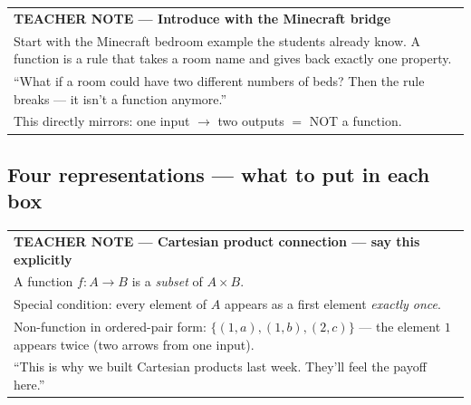 \documentclass[11pt]{article}
\begin{document}
\bigskip

\begin{tabular}{|p{\dimexpr\linewidth-2\tabcolsep-2\arrayrulewidth\relax}|}
\hline
{\small\bfseries\sffamily TEACHER NOTE --- Introduce with the Minecraft bridge}\\[3pt]
\small Start with the Minecraft bedroom example the students already know.
A function is a rule that takes a room name and gives back exactly one property.\\[3pt]
``What if a room could have two different numbers of beds?
Then the rule breaks --- it isn't a function anymore.''\\[3pt]
This directly mirrors: one input $\to$ two outputs $=$ NOT a function.\\[2pt]
\hline
\end{tabular}

\bigskip

\subsection*{Four representations --- what to put in each box}

\medskip\noindent{}

\medskip
\begin{tabular}{|p{\dimexpr\linewidth-2\tabcolsep-2\arrayrulewidth\relax}|}
\hline
{\small\bfseries\sffamily TEACHER NOTE --- Cartesian product connection --- say this explicitly}\\[3pt]
\small A function $f : A \to B$ is a \emph{subset} of $A \times B$.\\[3pt]
Special condition: every element of $A$ appears as a first element \emph{exactly once}.\\[3pt]
Non-function in ordered-pair form: $\{(1,a),(1,b),(2,c)\}$ ---
the element $1$ appears twice (two arrows from one input).\\[3pt]
``This is why we built Cartesian products last week. They'll feel the payoff here.''\\[2pt]
\hline
\end{tabular}
\end{document}
